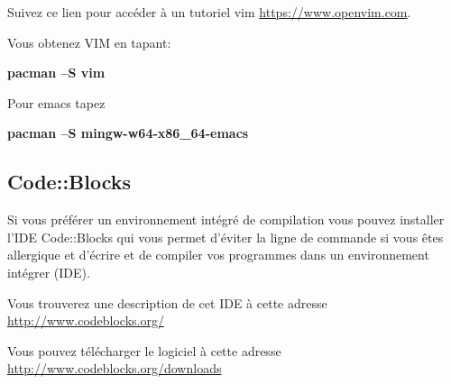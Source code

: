 \documentclass{article}
\begin{document}
Suivez ce lien pour accéder à un tutoriel vim \href{https://www.openvim.com}{https://www.openvim.com}.

Vous obtenez VIM en tapant: 
\begin{tcolorbox}[width=\textwidth,colframe=Purple,colback={black},title={Ceci est la console MSYS2 Shell},outer arc=0mm,colupper=white]    
      \large\textbf{pacman –S vim}
\end{tcolorbox}
Pour emacs tapez 
\begin{tcolorbox}[width=\textwidth,colframe=Purple,colback={black},title={Ceci est la console MSYS2 Shell},outer arc=0mm,colupper=white]    
      \large\textbf{pacman –S mingw-w64-x86\_64-emacs}
\end{tcolorbox}

\subsection{Code::Blocks}
Si vous préférer un environnement intégré de compilation vous pouvez installer l'IDE Code::Blocks qui vous permet d'éviter la ligne de commande si vous êtes allergique et d'écrire et de compiler vos programmes dans un environnement intégrer (IDE).

Vous trouverez une description de cet IDE à cette adresse \href{http://www.codeblocks.org/}{http://www.codeblocks.org/}

Vous pouvez télécharger le logiciel à cette adresse \href{http://www.codeblocks.org/downloads}{http://www.codeblocks.org/downloads}
\end{document}
